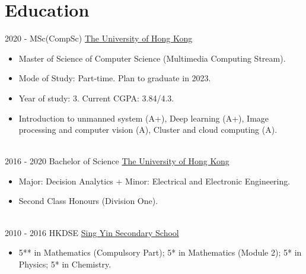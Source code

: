 \documentclass[letterpaper]{twentysecondcv} %
\begin{document}
\section{Education}{\faGraduationCap}

\begin{twenty} %
\twentyitemshorttest
    	{2020 - }
        {}
        {MSc(CompSc)}
        {\href{https://www.msc-cs.hku.hk}{The University of Hong Kong}}
        {}
        {\vspace{-2mm}\begin{itemize}[topsep=0pt,partopsep=0pt]
        \item Master of Science of Computer Science (Multimedia Computing Stream).
        \item Mode of Study: Part-time. Plan to graduate in 2023.
        \item Year of study: 3. Current CGPA: 3.84/4.3.
        \item Introduction to unmanned system (A+), Deep learning (A+), 	
		Image processing and computer vision (A), Cluster and cloud computing (A).
    \end{itemize}} \\
    
	\twentyitemshorttest
    	{2016 - 2020}
        {}
        {Bachelor of Science}
        {\href{https://www.scifac.hku.hk/prospective/ug/6901-bsc/features}{The University of Hong Kong}}
        {}
        {\vspace{-2mm}\begin{itemize}[topsep=0pt,partopsep=0pt]
        \item Major: Decision Analytics + Minor:  Electrical and Electronic Engineering.
        \item Second Class Honours (Division One).
    \end{itemize}} \\
				
	\twentyitemshorttest
    	{2010 - 2016}
		{}
        {HKDSE}
        {\href{http://www.singyin.edu.hk/en/}{Sing Yin Secondary School}}
        {}
        {\vspace{-2mm}\begin{itemize}[topsep=0pt,partopsep=0pt]
        \item 5** in Mathematics (Compulsory Part); 5* in Mathematics (Module 2); 5* in Physics; 5* in Chemistry.
    \end{itemize}} \\

\end{twenty}
\end{document}
